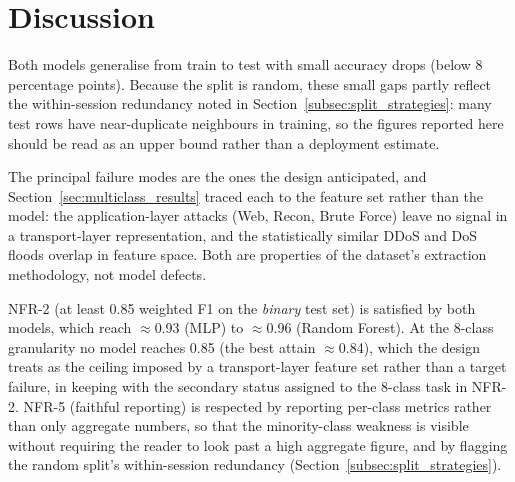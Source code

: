 \section{Discussion}
\label{sec:discussion}

\par Both models generalise from train to test with small accuracy drops (below 8 percentage points). Because the split is random, these small gaps partly reflect the within-session redundancy noted in Section~\ref{subsec:split_strategies}: many test rows have near-duplicate neighbours in training, so the figures reported here should be read as an upper bound rather than a deployment estimate.

\par The principal failure modes are the ones the design anticipated, and Section~\ref{sec:multiclass_results} traced each to the feature set rather than the model: the application-layer attacks (Web, Recon, Brute Force) leave no signal in a transport-layer representation, and the statistically similar DDoS and DoS floods overlap in feature space. Both are properties of the dataset's extraction methodology, not model defects.

\par NFR-2 (at least 0.85 weighted F1 on the \emph{binary} test set) is satisfied by both models, which reach $\approx$0.93 (MLP) to $\approx$0.96 (Random Forest). At the 8-class granularity no model reaches 0.85 (the best attain $\approx$0.84), which the design treats as the ceiling imposed by a transport-layer feature set rather than a target failure, in keeping with the secondary status assigned to the 8-class task in NFR-2. NFR-5 (faithful reporting) is respected by reporting per-class metrics rather than only aggregate numbers, so that the minority-class weakness is visible without requiring the reader to look past a high aggregate figure, and by flagging the random split's within-session redundancy (Section~\ref{subsec:split_strategies}).

